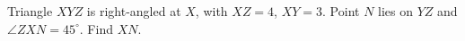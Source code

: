Triangle $XYZ$ is right-angled at $X$, with $XZ=4$, $XY=3$. Point $N$ lies on $YZ$ and $\angle ZXN=45^\circ$. Find $XN$.
